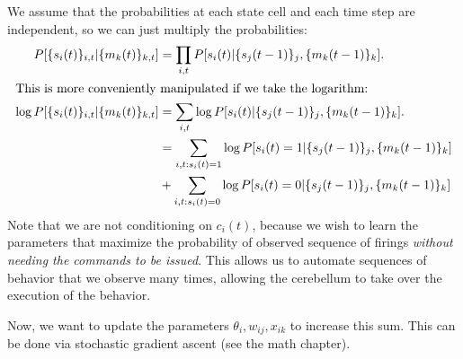\documentclass{article}
\theoremstyle{definition}
\begin{document}
We assume that the probabilities at each state cell and each time step
are independent, so we can just multiply the probabilities:
\begin{align*}
P[\{s_i(t)\}_{i,t} | \{m_k(t)\}_{k,t}] &=
\prod_{i,t} P[s_i(t) | \{s_j(t-1)\}_j, \{m_k(t-1)\}_k]. \\
\intertext{This is more conveniently manipulated if we take the
  logarithm:}
\log P[\{s_i(t)\}_{i,t} | \{m_k(t)\}_{k,t}] &=
\sum_{i,t} \log P[s_i(t) | \{s_j(t-1)\}_j, \{m_k(t-1)\}_k]. \\
&= \sum_{i,t: s_i(t)=1} \log P[s_i(t)=1 | \{s_j(t-1)\}_j, \{m_k(t-1)\}_k] \\
& + \sum_{i,t: s_i(t)=0} \log P[s_i(t)=0 | \{s_j(t-1)\}_j, \{m_k(t-1)\}_k] \\
\end{align*}
Note that we are not conditioning on $c_i(t)$, because we wish to
learn the parameters that maximize the probability of observed
sequence of firings {\em without needing the commands to be
  issued}. This allows us to automate sequences of behavior that we
observe many times, allowing the cerebellum to take over the execution
of the behavior.

Now, we want to update the parameters $\theta_i, w_{ij}, x_{ik}$ to
increase this sum. This can be done via stochastic gradient ascent
(see the math chapter).
\end{document}
